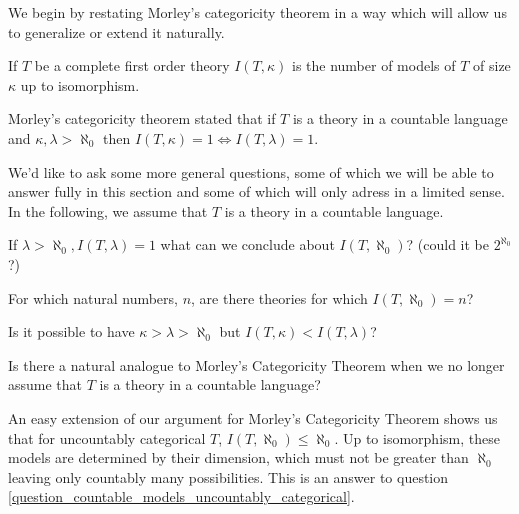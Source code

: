 We begin by restating Morley's categoricity theorem in a way which will allow us to generalize or extend it naturally.

\begin{definition}\label{definition_number_models}
If \(T\) be a complete first order theory \(I(T, \kappa)\) is the number of models of \(T\) of size \(\kappa\) up to isomorphism.
\end{definition}

Morley's categoricity theorem stated that if \(T\) is a theory in a countable language and \(\kappa, \lambda > \aleph_0\) then \(I(T, \kappa) = 1 \iff I(T, \lambda) = 1\). 

We'd like to ask some more general questions, some of which we will be able to answer fully in this section and some of which will only adress in a limited sense. 
In the following, we assume that \(T\) is a theory in a countable language. 

\begin{question}\label{question_countable_models_uncountably_categorical}
If \(\lambda > \aleph_0, I(T, \lambda) = 1\) what can we conclude about \(I(T, \aleph_0)\)? (could it be \(2^{\aleph_0}\)?)
\end{question}

\begin{question}\label{question_finite_spectra}
For which natural numbers, \(n\), are there theories for which  \(I(T, \aleph_0) = n\)?
\end{question}


\begin{question}\label{question_morleys_conjecture}
Is it possible to have \(\kappa > \lambda > \aleph_0\) but \(I(T, \kappa) < I(T, \lambda)\)?
\end{question}

\begin{question}\label{question_los_conjecture_uncountable_languages}
Is there a natural analogue to Morley's Categoricity Theorem when we no longer assume that \(T\) is a theory in a countable language?
\end{question}


An easy extension of our argument for Morley's Categoricity Theorem shows us that for uncountably categorical \(T\), \(I(T, \aleph_0)\leq \aleph_0\).
Up to isomorphism, these models are determined by their dimension, which must not be greater than \(\aleph_0\) leaving only countably many possibilities. 
This is an answer to question \ref{question_countable_models_uncountably_categorical}.

